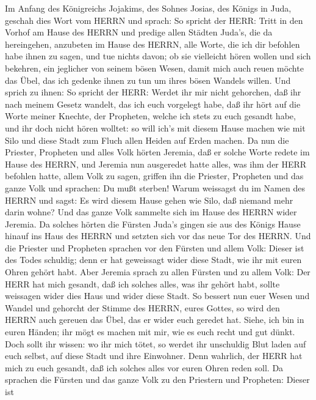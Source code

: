  Im Anfang des Königreichs Jojakims, des Sohnes Josias, des
Königs in Juda, geschah dies Wort vom HERRN und sprach:  So
spricht der HERR: Tritt in den Vorhof am Hause des HERRN und predige
allen Städten Juda's, die da hereingehen, anzubeten im Hause des HERRN,
alle Worte, die ich dir befohlen habe ihnen zu sagen, und tue nichts
davon;  ob sie vielleicht hören wollen und sich bekehren,
ein jeglicher von seinem bösen Wesen, damit mich auch reuen möchte das
Übel, das ich gedenke ihnen zu tun um ihres bösen Wandels willen.
 Und sprich zu ihnen: So spricht der HERR: Werdet ihr mir
nicht gehorchen, daß ihr nach meinem Gesetz wandelt, das ich euch
vorgelegt habe,  daß ihr hört auf die Worte meiner Knechte,
der Propheten, welche ich stets zu euch gesandt habe, und ihr doch nicht
hören wolltet:  so will ich's mit diesem Hause machen wie
mit Silo und diese Stadt zum Fluch allen Heiden auf Erden machen.
 Da nun die Priester, Propheten und alles Volk hörten
Jeremia, daß er solche Worte redete im Hause des HERRN,  und
Jeremia nun ausgeredet hatte alles, was ihm der HERR befohlen hatte,
allem Volk zu sagen, griffen ihn die Priester, Propheten und das ganze
Volk und sprachen: Du mußt sterben!  Warum weissagst du im
Namen des HERRN und sagst: Es wird diesem Hause gehen wie Silo, daß
niemand mehr darin wohne? Und das ganze Volk sammelte sich im Hause des
HERRN wider Jeremia.  Da solches hörten die Fürsten Juda's
gingen sie aus des Königs Hause hinauf ins Haus des HERRN und setzten
sich vor das neue Tor des HERRN.  Und die Priester und
Propheten sprachen vor den Fürsten und allem Volk: Dieser ist des Todes
schuldig; denn er hat geweissagt wider diese Stadt, wie ihr mit euren
Ohren gehört habt.  Aber Jeremia sprach zu allen Fürsten
und zu allem Volk: Der HERR hat mich gesandt, daß ich solches alles, was
ihr gehört habt, sollte weissagen wider dies Haus und wider diese Stadt.
 So bessert nun euer Wesen und Wandel und gehorcht der
Stimme des HERRN, eures Gottes, so wird den HERRN auch gereuen das Übel,
das er wider euch geredet hat.  Siehe, ich bin in euren
Händen; ihr mögt es machen mit mir, wie es euch recht und gut dünkt.
 Doch sollt ihr wissen: wo ihr mich tötet, so werdet ihr
unschuldig Blut laden auf euch selbst, auf diese Stadt und ihre
Einwohner. Denn wahrlich, der HERR hat mich zu euch gesandt, daß ich
solches alles vor euren Ohren reden soll.  Da sprachen die
Fürsten und das ganze Volk zu den Priestern und Propheten: Dieser ist
